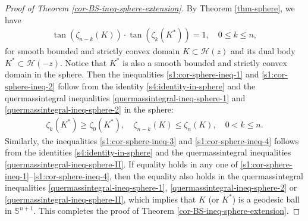 \documentclass[11pt,reqno]{amsart}
\theoremstyle{definition}
\theoremstyle{remark}
\numberwithin{equation}{section}
\renewcommand{\(}{\left(}
\renewcommand{\)}{\right)}
\renewcommand{\~}{\tilde}
\renewcommand{\-}{\overline}
\begin{document}
\begin{proof}[Proof of Theorem \ref{cor-BS-ineq-sphere-extension}]
By Theorem \ref{thm-sphere}, we have
\begin{align}\label{s4:identity-in-sphere}
\tan\(\zeta_{n-k}(K)\)\cdot \tan\(\zeta_{k}(K^\ast)\)=1, \quad 0\leq k\leq n,
\end{align}
for smooth bounded and strictly convex domain $K\subset \mathcal{H}(z)$ and its dual body $K^\ast\subset \mathcal{H}(-z)$. Notice that $K^\ast$ is also a smooth bounded and strictly convex domain in the sphere. Then the inequalities \eqref{s1:cor-sphere-ineq-1} and \eqref{s1:cor-sphere-ineq-2} follow from the identity \eqref{s4:identity-in-sphere} and the quermassintegral inequalities \eqref{quermassintegral-ineq-sphere-1} and \eqref{quermassintegral-ineq-sphere-2} in the sphere:
\begin{align}\label{s4:identity-quermassintegral-ineq-sphere}
\zeta_k(K^\ast) \geq \zeta_0(K^\ast), \quad \zeta_{n-k}(K) \leq \zeta_n(K), \quad 0<k\leq n.
\end{align} 
Similarly, the inequalities \eqref{s1:cor-sphere-ineq-3} and \eqref{s1:cor-sphere-ineq-4} follows from the identities \eqref{s4:identity-in-sphere}
and the quermassintegral inequalities \eqref{quermassintegral-ineq-sphere-II}. If equality holds in any one of \eqref{s1:cor-sphere-ineq-1}--\eqref{s1:cor-sphere-ineq-4}, then the equality also holds in the quermassintegral inequalities \eqref{quermassintegral-ineq-sphere-1}, \eqref{quermassintegral-ineq-sphere-2} or \eqref{quermassintegral-ineq-sphere-II}, which implies that $K$ (or $K^\ast$) is a geodesic ball in $\mathbb S^{n+1}$. This completes the proof of Theorem \ref{cor-BS-ineq-sphere-extension}.
\end{proof}
\end{document}
